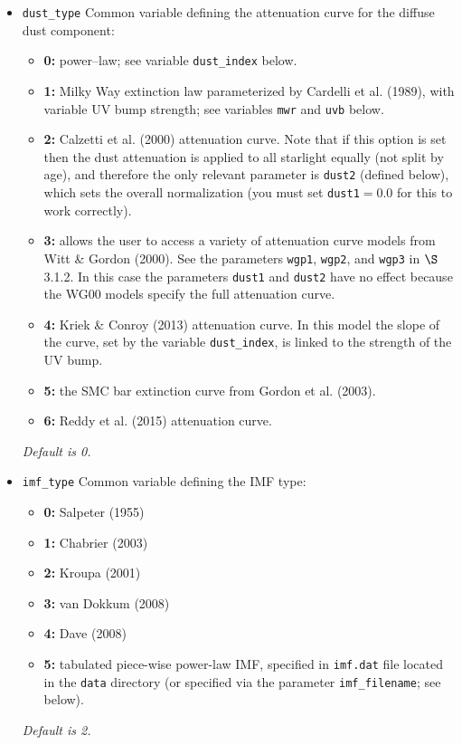 \documentclass[]{article}
\begin{document}
\begin{itemize}
\item \texttt{dust\_type}
Common variable defining the attenuation curve for the diffuse dust component:

  \begin{itemize}
  \item {\bf 0:} power--law; see variable \texttt{dust\_index} below.
  \item {\bf 1:} Milky Way extinction law parameterized by Cardelli et al.
    (1989), with variable UV bump strength; see variables \texttt{mwr} and
    \texttt{uvb} below.
  \item {\bf 2:} Calzetti et al. (2000) attenuation curve.  Note that if this
    option is set then the dust attenuation is applied to all starlight equally
    (not split by age), and therefore the only relevant parameter is
    \texttt{dust2} (defined below), which sets the overall normalization (you
    must set \texttt{dust1}$=0.0$ for this to work correctly).
  \item {\bf 3:} allows the user to access a variety of attenuation curve models
    from Witt \& Gordon (2000).  See the parameters \texttt{wgp1},
    \texttt{wgp2}, and \texttt{wgp3} in $\S$3.1.2.  In this case the parameters
    \texttt{dust1} and \texttt{dust2} have no effect because the WG00 models
    specify the full attenuation curve.
  \item {\bf 4: } Kriek \& Conroy (2013) attenuation curve.  In this model the
    slope of the curve, set by the variable \texttt{dust\_index}, is linked to
    the strength of the UV bump.
  \item {\bf 5: } the SMC bar extinction curve from Gordon et al. (2003).
  \item {\bf 6: } Reddy et al. (2015) attenuation curve.
  \end{itemize}

{\it Default is 0.}

\end{itemize}

\begin{itemize}
\item \texttt{imf\_type}
Common variable defining the IMF type:

  \begin{itemize}
  \item {\bf 0:}  Salpeter (1955)
  \item {\bf 1:}  Chabrier (2003)
  \item {\bf 2:}  Kroupa (2001)
  \item {\bf 3:}  van Dokkum (2008)
  \item {\bf 4:}  Dave (2008)
  \item {\bf 5:}  tabulated piece-wise power-law IMF, specified in
    \texttt{imf.dat} file located in the \texttt{data} directory (or specified
    via the parameter \texttt{imf\_filename}; see below).
  \end{itemize}

{\it Default is 2.}
\end{itemize}
\end{document}
